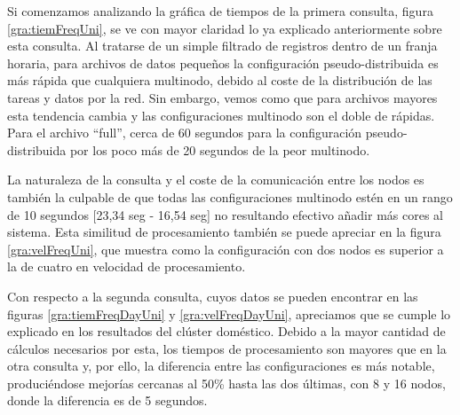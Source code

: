 Si comenzamos analizando la gráfica de tiempos de la primera consulta, figura \ref{gra:tiemFreqUni}, se ve con mayor claridad lo ya explicado anteriormente sobre esta consulta. Al tratarse de un simple filtrado de registros dentro de un franja horaria, para archivos de datos pequeños la configuración pseudo-distribuida es más rápida que cualquiera multinodo, debido al coste de la distribución de las tareas y datos por la red. Sin embargo, vemos como que para archivos mayores esta tendencia cambia y las configuraciones multinodo son el doble de rápidas. Para el archivo ``full'', cerca de 60 segundos para la configuración pseudo-distribuida por los poco más de 20 segundos de la peor multinodo.

La naturaleza de la consulta y el coste de la comunicación entre los nodos es también la culpable de que todas las configuraciones multinodo estén en un rango de 10 segundos [23,34 seg - 16,54 seg] no resultando efectivo añadir más cores al sistema. Esta similitud de procesamiento también se puede apreciar en la figura \ref{gra:velFreqUni}, que muestra como la configuración con dos nodos es superior a la de cuatro en velocidad de procesamiento.

Con respecto a la segunda consulta, cuyos datos se pueden encontrar en las figuras \ref{gra:tiemFreqDayUni} y \ref{gra:velFreqDayUni}, apreciamos que se cumple lo explicado en los resultados del clúster doméstico. Debido a la mayor cantidad de cálculos necesarios por esta, los tiempos de procesamiento son mayores que en la otra consulta y, por ello, la diferencia entre las configuraciones es más notable, produciéndose mejorías cercanas al 50\% hasta las dos últimas, con 8 y 16 nodos, donde la diferencia es de 5 segundos.

